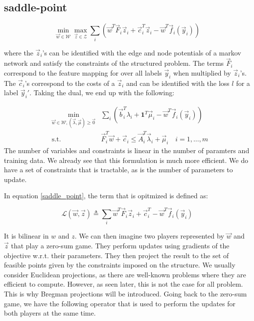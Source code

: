 \subsection{saddle-point}
\begin{equation}
  \min_{\vec w \in \mathcal{W}} \max_{\vec z \in \mathcal{Z}} \sum_i \left( \vec
w^T \vec F_i \vec z_i + \vec c_i^T \vec z_i - \vec w^T \vec f_i(\vec y_i)
\right)
  \label{saddle_point}
\end{equation}

where the $\vec z_i$'s can be identified with the edge and node potentials of a
markov network and satisfy the constraints of the structured problem. The terms
$\vec F_i$ correspond to the feature mapping for over all labels $\vec y_i$ when
multiplied by $\vec z_i$'s. The $\vec c_i$'s correspond to the costs of a $\vec z_i$ and can be
identified with the loss $l$ for a label $\vec y_i'$. Taking the dual, we end up with
the following:

\begin{equation}
  \begin{aligned}
    &\min_{\vec w \in \mathcal{W}, (\vec \lambda,\vec \mu) \geq \vec 0} &\sum_i
\left( \vec b_i^T \lambda_i + \mathbf{1}^T \vec \mu_i - \vec w^T \vec f_i(\vec
y_i) \right)\\ &\text{s.t.} &\vec F_i^T \vec w + \vec c_i \leq \vec A_i^T \vec
\lambda_i + \vec \mu_i \quad i=1,\dots,m
  \end{aligned}
\end{equation}
The number of variables and constraints is linear in the number of paramters and
training data. We already see that this formulation is much more efficient. We
do have a set of constraints that is tractable, as is the number of parameters
to update.

In equation \ref{saddle_point}, the term that is opitmized is defined
as:

\begin{equation}
  \mathcal{L}(\vec w,\vec z) \triangleq \sum_i \vec w^T \vec F_i \vec z_i + \vec
c_i^T - \vec w^T \vec f_i(\vec y_i)
  \label{saddle_obj}
\end{equation}

It is bilinear in $w$ and $z$. We can then imagine two players represented by
$\vec w$ and $\vec z$ that play a zero-sum game. They perform updates using gradients of
the objective w.r.t. their parameters. They then project the result to the set
of feasible points given by the constraints imposed on the structure. We usually
consider Euclidean projections, as there are well-known problems where they are
efficient to compute. However, as seen later, this is not the case for all
problem. This is why Bregman projections will be introduced. Going back to the
zero-sum game, we have the following operator that is used to perform the
updates for both players at the same time.

